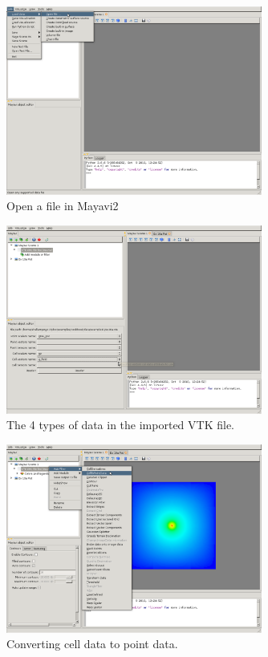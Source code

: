 \begin{figure}[ht]
\centering
\includegraphics[width=0.75\textwidth]{figures/mayavi2_openfile.png}
\caption{Open a file in Mayavi2}
\label{fig:mayavi2openfile}
\end{figure}

\begin{figure}[ht]
\centering
\includegraphics[width=0.75\textwidth]{figures/mayavi2_data.png}
\caption{The 4 types of data in the imported VTK file.}
\label{fig:mayavi2data}
\end{figure}

\begin{figure}[ht]
\centering
\includegraphics[width=0.75\textwidth]{figures/mayavi2_cell2point.png}
\caption{Converting cell data to point data.}
\label{fig:mayavi2cell2point}
\end{figure}

